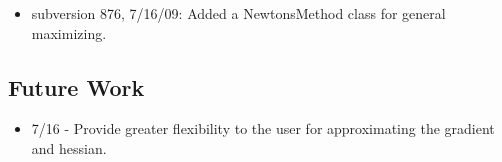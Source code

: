 \begin{itemize}
\item subversion 876, 7/16/09: Added a NewtonsMethod class for general
maximizing.
\end{itemize}

\subsection*{Future Work}

\begin{itemize}
\item 7/16 - Provide greater flexibility to the user for approximating the
gradient and hessian.
\end{itemize}


%
